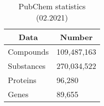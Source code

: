 \begin{table}[h]
\caption{PubChem statistics (02.2021)}
\vspace{0.25em}
\centering
\begin{tabular}{|l|l|}
\hline
\multicolumn{1}{|c|}{\textbf{Data}} & \multicolumn{1}{c|}{\textbf{Number}} \\ \hline
Compounds                           & 109,487,163                          \\ \hline
Substances                          & 270,034,522                          \\ \hline
Proteins                            & 96,280                               \\ \hline
Genes                               & 89,655                               \\ \hline
\end{tabular}
\label{tab:pubchem_stats}
\end{table}